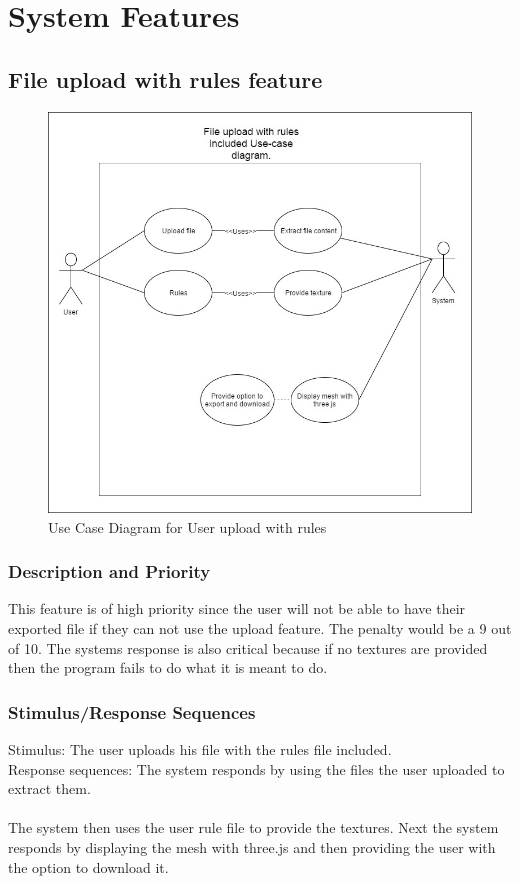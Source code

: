\documentclass[english]{article}
\begin{document}
	\section{System Features}		
		\subsection{File upload with rules feature}
		\begin{figure}[h]
			\includegraphics[width=\textwidth]{rules.jpg}
			\caption{Use Case Diagram for User upload with rules }
		\end{figure}

			 \subsubsection{Description and Priority}
			 	This feature is of high priority since the user will not be able to have their exported file if they can not use the upload feature. The penalty would be a 9 out of 10. The systems response is also critical because if no textures are provided then the program fails to do what it is meant to do.
			 \subsubsection{Stimulus/Response Sequences}
			 	Stimulus: The user uploads his file with the rules file included.\\
			 	Response sequences: The system responds by using the files the user uploaded to extract them.\\\\
			 	 The system then uses the user rule file to provide the textures. Next the system responds by displaying the mesh with three.js and then providing the user with the option to download it. 
\end{document}
